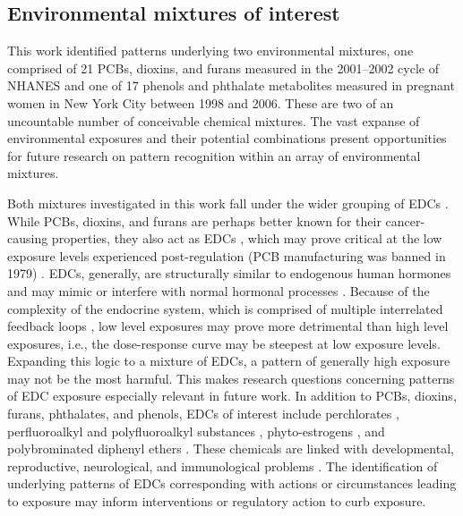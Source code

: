 \subsection{Environmental mixtures of interest}
This work identified patterns underlying two environmental mixtures, one comprised of 21 PCBs, dioxins, and furans measured in the 2001--2002 cycle of NHANES and one of 17 phenols and phthalate metabolites measured in pregnant women in New York City between 1998 and 2006. These are two of an uncountable number of conceivable chemical mixtures. The vast expanse of environmental exposures and their potential combinations present opportunities for future research on pattern recognition within an array of environmental mixtures. 

Both mixtures investigated in this work fall under the wider grouping of EDCs \citep{gore2015edc}. While PCBs, dioxins, and furans are perhaps better known for their cancer-causing properties, they also act as EDCs \citep{van1998toxic}, which may prove critical at the low exposure levels experienced post-regulation (PCB manufacturing was banned in 1979) \citep{trost1989regulation}. EDCs, generally, are structurally similar to endogenous human hormones and may mimic or interfere with normal hormonal processes \citep{kavlock1996research, zoeller2012endocrine}. Because of the complexity of the endocrine system, which is comprised of multiple interrelated feedback loops \citep{diamanti2009endocrine}, low level exposures may prove more detrimental than high level exposures, i.e., the dose-response curve may be steepest at low exposure levels. Expanding this logic to a mixture of EDCs, a pattern of generally high exposure may not be the most harmful. This makes research questions concerning patterns of EDC exposure especially relevant in future work. In addition to PCBs, dioxins, furans, phthalates, and phenols, EDCs of interest include perchlorates \citep{nizinski2020perchlorate}, perfluoroalkyl and polyfluoroalkyl substances \citep{pfaswebsite}, phyto-estrogens \citep{yilmaz2020endocrine}, and polybrominated diphenyl ethers \citep{gibson2018effects}. These chemicals are linked with developmental, reproductive, neurological, and immunological problems \citep{solomon2000environment, meeker2012exposure, kabir2015review}. The identification of underlying patterns of EDCs corresponding with actions or circumstances leading to exposure may inform interventions or regulatory action to curb exposure.

